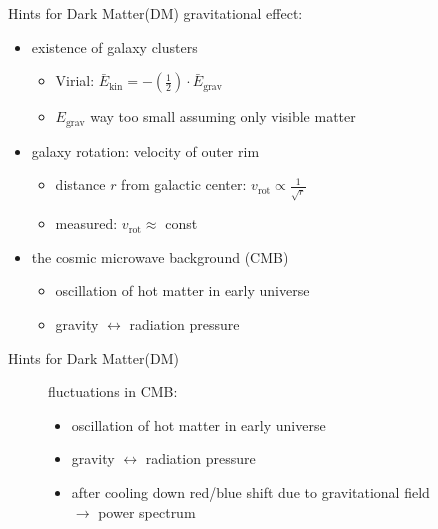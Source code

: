 \documentclass[11pt,a4paper,titlepage]{beamer}
\begin{document}
\begin{frame}{Hints for Dark Matter(DM)}
gravitational effect:
\begin{itemize}
\item existence of galaxy clusters
\begin{itemize}
\item Virial: $\bar{E}_\text{kin}=-\left(\frac{1}{2}\right)\cdot \bar{E}_\text{grav}$\vfill
\item $E_\text{grav}$ way too small assuming only visible matter
\end{itemize}\vfill\pause
\item galaxy rotation: velocity of outer rim
\begin{itemize}
\item distance $r$ from galactic center: $v_\text{rot}\propto\frac{1}{\sqrt{r}}$\vfill
\item measured: $v_\text{rot}\approx$ const
\end{itemize}\vfill\pause
\item the cosmic microwave background (CMB)
\begin{itemize}
\item oscillation of hot matter in early universe\vfill
\item gravity $\leftrightarrow$ radiation pressure
\end{itemize}
\end{itemize}
\end{frame}
\begin{frame}{Hints for Dark Matter(DM)}
\begin{figure}
\begin{minipage}{0.45\textwidth}
fluctuations in CMB:
\begin{itemize}
\item oscillation of hot matter in early universe\vfill
\item gravity $\leftrightarrow$ radiation pressure\vfill
\item after cooling down red/blue shift due to gravitational field\\
$\rightarrow$ power spectrum
\end{itemize}
\end{minipage}
\begin{minipage}{0.53\textwidth}
\end{minipage}
\end{figure}
\end{frame}
\end{document}
